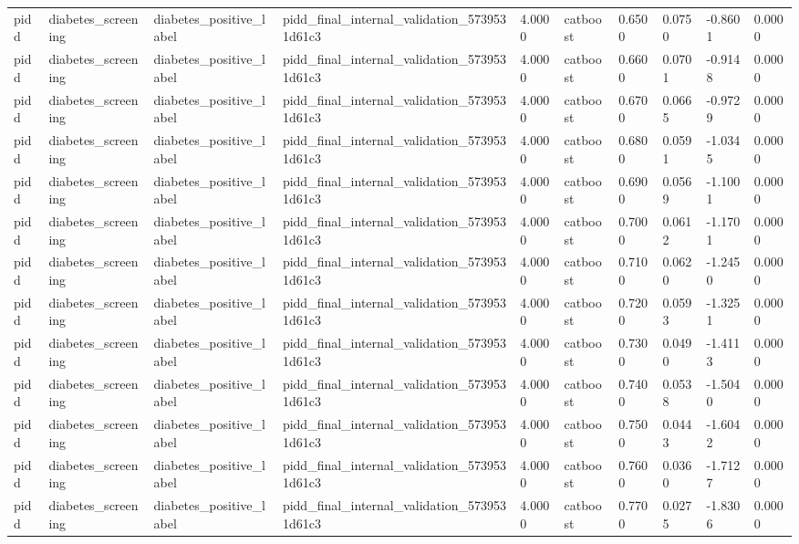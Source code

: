 \begin{tabular}{llllllllll}
pidd & diabetes\_screening & diabetes\_positive\_label & pidd\_final\_internal\_validation\_5739531d61c3 & 4.0000 & catboost & 0.6500 & 0.0750 & -0.8601 & 0.0000 \\
pidd & diabetes\_screening & diabetes\_positive\_label & pidd\_final\_internal\_validation\_5739531d61c3 & 4.0000 & catboost & 0.6600 & 0.0701 & -0.9148 & 0.0000 \\
pidd & diabetes\_screening & diabetes\_positive\_label & pidd\_final\_internal\_validation\_5739531d61c3 & 4.0000 & catboost & 0.6700 & 0.0665 & -0.9729 & 0.0000 \\
pidd & diabetes\_screening & diabetes\_positive\_label & pidd\_final\_internal\_validation\_5739531d61c3 & 4.0000 & catboost & 0.6800 & 0.0591 & -1.0345 & 0.0000 \\
pidd & diabetes\_screening & diabetes\_positive\_label & pidd\_final\_internal\_validation\_5739531d61c3 & 4.0000 & catboost & 0.6900 & 0.0569 & -1.1001 & 0.0000 \\
pidd & diabetes\_screening & diabetes\_positive\_label & pidd\_final\_internal\_validation\_5739531d61c3 & 4.0000 & catboost & 0.7000 & 0.0612 & -1.1701 & 0.0000 \\
pidd & diabetes\_screening & diabetes\_positive\_label & pidd\_final\_internal\_validation\_5739531d61c3 & 4.0000 & catboost & 0.7100 & 0.0620 & -1.2450 & 0.0000 \\
pidd & diabetes\_screening & diabetes\_positive\_label & pidd\_final\_internal\_validation\_5739531d61c3 & 4.0000 & catboost & 0.7200 & 0.0593 & -1.3251 & 0.0000 \\
pidd & diabetes\_screening & diabetes\_positive\_label & pidd\_final\_internal\_validation\_5739531d61c3 & 4.0000 & catboost & 0.7300 & 0.0490 & -1.4113 & 0.0000 \\
pidd & diabetes\_screening & diabetes\_positive\_label & pidd\_final\_internal\_validation\_5739531d61c3 & 4.0000 & catboost & 0.7400 & 0.0538 & -1.5040 & 0.0000 \\
pidd & diabetes\_screening & diabetes\_positive\_label & pidd\_final\_internal\_validation\_5739531d61c3 & 4.0000 & catboost & 0.7500 & 0.0443 & -1.6042 & 0.0000 \\
pidd & diabetes\_screening & diabetes\_positive\_label & pidd\_final\_internal\_validation\_5739531d61c3 & 4.0000 & catboost & 0.7600 & 0.0360 & -1.7127 & 0.0000 \\
pidd & diabetes\_screening & diabetes\_positive\_label & pidd\_final\_internal\_validation\_5739531d61c3 & 4.0000 & catboost & 0.7700 & 0.0275 & -1.8306 & 0.0000 \\

\end{tabular}
